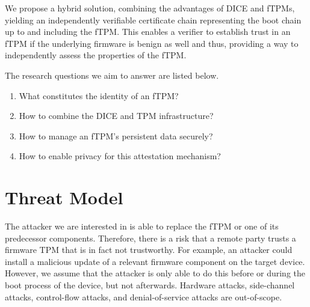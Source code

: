 
We propose a hybrid solution, combining the advantages of \ac{DICE} and \acp{fTPM}, yielding an independently verifiable certificate chain representing the boot chain up to and including the \ac{fTPM}.
This enables a verifier to establish trust in an \ac{fTPM} if the underlying firmware is benign as well and thus, providing a way to independently assess the properties of the \ac{fTPM}.


The research questions we aim to answer are listed below.
\begin{enumerate}[label=\textbf{RQ-\arabic*}]
  \item What constitutes the identity of an fTPM\@?\label{rq:1-tpm-identity} %
  \item How to combine the DICE and TPM infrastructure?\label{rq:2-combine-infrastructure} %
  \item How to manage an fTPM's persistent data securely?\label{rq:3-secure-data} %
  \item How to enable privacy for this attestation mechanism?\label{rq:4-privacy}
\end{enumerate}



\section{Threat Model}



The attacker we are interested in is able to replace the fTPM or one of its predecessor components.
Therefore, there is a risk that a remote party trusts a firmware TPM that is in fact not trustworthy.
For example, an attacker could install a malicious update of a relevant firmware component on the target device.
However, we assume that the attacker is only able to do this before or during the boot process of the device, but not afterwards.
Hardware attacks, side-channel attacks, control-flow attacks, and denial-of-service attacks are out-of-scope.

